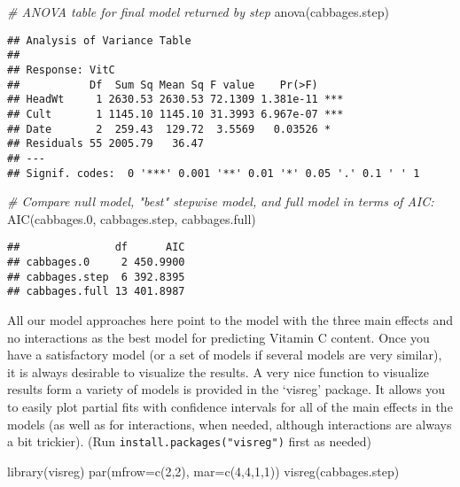 \documentclass[
]{article}
\newenvironment{Shaded}{\begin{snugshade}}{\end{snugshade}}
\newcommand{\AttributeTok}[1]{\textcolor[rgb]{0.77,0.63,0.00}{#1}}
\newcommand{\CommentTok}[1]{\textcolor[rgb]{0.56,0.35,0.01}{\textit{#1}}}
\newcommand{\DecValTok}[1]{\textcolor[rgb]{0.00,0.00,0.81}{#1}}
\newcommand{\FloatTok}[1]{\textcolor[rgb]{0.00,0.00,0.81}{#1}}
\newcommand{\FunctionTok}[1]{\textcolor[rgb]{0.00,0.00,0.00}{#1}}
\newcommand{\NormalTok}[1]{#1}
\begin{document}
\begin{Shaded}
\begin{Highlighting}[]
\CommentTok{\# ANOVA table for final model returned by \textquotesingle{}step\textquotesingle{}}
\FunctionTok{anova}\NormalTok{(cabbages.step)}
\end{Highlighting}
\end{Shaded}

\begin{verbatim}
## Analysis of Variance Table
## 
## Response: VitC
##           Df  Sum Sq Mean Sq F value    Pr(>F)    
## HeadWt     1 2630.53 2630.53 72.1309 1.381e-11 ***
## Cult       1 1145.10 1145.10 31.3993 6.967e-07 ***
## Date       2  259.43  129.72  3.5569   0.03526 *  
## Residuals 55 2005.79   36.47                      
## ---
## Signif. codes:  0 '***' 0.001 '**' 0.01 '*' 0.05 '.' 0.1 ' ' 1
\end{verbatim}

\begin{Shaded}
\begin{Highlighting}[]
\CommentTok{\# Compare null model, "best" stepwise model, and full model in terms of AIC:}
\FunctionTok{AIC}\NormalTok{(cabbages}\FloatTok{.0}\NormalTok{, cabbages.step, cabbages.full)}
\end{Highlighting}
\end{Shaded}

\begin{verbatim}
##               df      AIC
## cabbages.0     2 450.9900
## cabbages.step  6 392.8395
## cabbages.full 13 401.8987
\end{verbatim}

All our model approaches here point to the model with the three main
effects and no interactions as the best model for predicting Vitamin C
content. Once you have a satisfactory model (or a set of models if
several models are very similar), it is always desirable to visualize
the results. A very nice function to visualize results form a variety of
models is provided in the `visreg' package. It allows you to easily plot
partial fits with confidence intervals for all of the main effects in
the models (as well as for interactions, when needed, although
interactions are always a bit trickier). (Run
\texttt{install.packages("visreg")} first as needed)

\begin{Shaded}
\begin{Highlighting}[]
\FunctionTok{library}\NormalTok{(visreg)}
\FunctionTok{par}\NormalTok{(}\AttributeTok{mfrow=}\FunctionTok{c}\NormalTok{(}\DecValTok{2}\NormalTok{,}\DecValTok{2}\NormalTok{), }\AttributeTok{mar=}\FunctionTok{c}\NormalTok{(}\DecValTok{4}\NormalTok{,}\DecValTok{4}\NormalTok{,}\DecValTok{1}\NormalTok{,}\DecValTok{1}\NormalTok{))}
\FunctionTok{visreg}\NormalTok{(cabbages.step)}
\end{Highlighting}
\end{Shaded}
\end{document}
